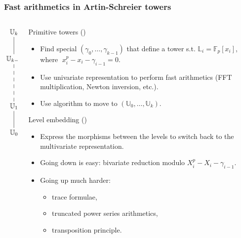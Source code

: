 \documentclass[10pt]{beamer}
\newcommand{\LK}{\mathbb{L}}  %
\newcommand{\U}{\mathbb{U}}  %
\newcommand{\F}{\mathbb{F}}  %
\newcommand{\0}{\mathcal{O}}  %
\begin{document}
\begin{frame}
  \frametitle{Fast arithmetics in Artin-Schreier towers}

  \begin{columns}
    \begin{column}{0.1\textwidth}
      \Large\[\xymatrix{
        \U_k\ar@{-}[d]\\
        \U_{k-1} \ar@{--}[dd]\\
        \\
        \U_1 \ar@{-}[d]\\
        \U_0
      }\]
    \end{column}
    \begin{column}{0.85\textwidth}
      \begin{block}{Primitive towers (\cite{DFS09})}
        \begin{itemize}
        \item Find special $(\gamma_0,\ldots,\gamma_{k-1})$ that
          define a tower s.t. $\LK_i = \F_p[x_i]$, where
          $\;x_i^p-x_i-\gamma_{i-1}=0$.
        \item Use univariate representation to perform fast
          arithmetics (FFT multiplication, Newton inversion, etc.).
        \item Use \cite{Couveignes00} algorithm to move to
          $(\U_0,\ldots,\U_k)$.
        \end{itemize}
      \end{block}
      
      \begin{block}{Level embedding (\cite{DFS09})}
        \begin{itemize}
        \item Express the morphisms between the levels to switch back
          to the multivariate representation.
        \item Going down is easy: bivariate reduction modulo
          $X_i^p-X_i-\gamma_{i-1}$.
        \item Going up much harder:
          \begin{itemize}
          \item trace formulae,
          \item truncated power series arithmetics,
          \item transposition principle.
          \end{itemize}
        \end{itemize}
      \end{block}
    \end{column}
  \end{columns}
\end{frame}
\end{document}
